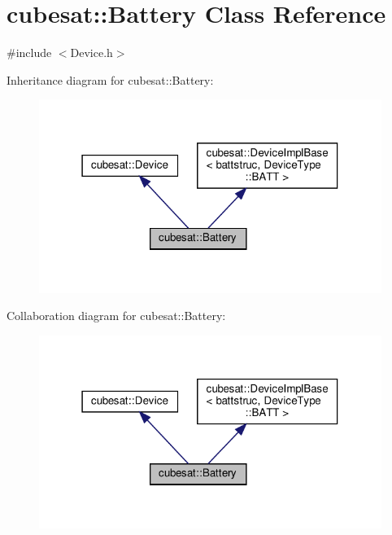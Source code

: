\hypertarget{classcubesat_1_1Battery}{}\section{cubesat\+:\+:Battery Class Reference}
\label{classcubesat_1_1Battery}


{\ttfamily \#include $<$Device.\+h$>$}



Inheritance diagram for cubesat\+:\+:Battery\+:
\nopagebreak
\begin{figure}[H]
\begin{center}
\leavevmode
\includegraphics[width=316pt]{classcubesat_1_1Battery__inherit__graph}
\end{center}
\end{figure}


Collaboration diagram for cubesat\+:\+:Battery\+:
\nopagebreak
\begin{figure}[H]
\begin{center}
\leavevmode
\includegraphics[width=316pt]{classcubesat_1_1Battery__coll__graph}
\end{center}
\end{figure}
